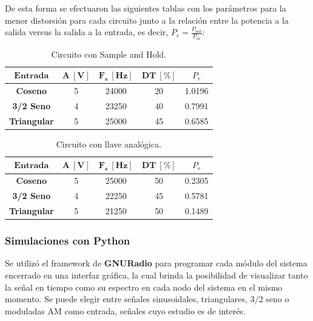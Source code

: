 De esta forma se efectuaron las siguientes tablas con los parámetros para la menor distorsión para cada circuito junto a la relación entre la potencia a la salida versus la salida a la entrada, es decir, $P_r = \frac{P_{out}}{P_{in}}$:
\begin{multicols}{2}
\begin{table}[H]
\centering
\begin{tabular}{ccccc}
\hline
$\mathbf{Entrada}$  & $\mathbf{A \ [V]}$ & $\mathbf{F_s \ [Hz]}$ & $\mathbf{DT \ [\%]}$ & $P_r$\\ \hline
\textbf{Coseno}     & 5                 & 24000                 & 20         &      1.0196     \\
\textbf{3/2 Seno}   & 4                & 23250                 & 40           &    0.7991     \\
\textbf{Triangular} & 5                  & 25000                 & 45          &       0.6585 	\\ \hline
\end{tabular}
\caption{Circuito con Sample and Hold.}
\label{tab:res1}
\end{table}
\begin{table}[H]
\centering
\begin{tabular}{ccccc}
\hline
$\mathbf{Entrada}$  & $\mathbf{A \ [V]}$ & $\mathbf{F_s \ [Hz]}$ & $\mathbf{DT \ [\%]}$ &$P_r$ \\ \hline
\textbf{Coseno}     & 5                  & 25000                 & 50       &     0.2305       \\
\textbf{3/2 Seno}   & 4                  & 22250                 & 45        &      0.5781     \\
\textbf{Triangular} & 5                  & 21250                 & 50         &    0.1489      \\ \hline
\end{tabular}
\caption{Circuito con llave analógica.}
\label{tab:res2}
\end{table}
\end{multicols}


\subsubsection{Simulaciones con Python}
Se utilizó el framework de \textbf{GNURadio} para programar cada módulo del sistema encerrado en una interfaz gráfica, la cual brinda la posibilidad de visualizar tanto la señal en tiempo como su espectro en cada nodo del sistema en el mismo momento. Se puede elegir entre señales sinusoidales, triangulares, 3/2 seno o moduladas AM como entrada, señales cuyo estudio es de interés.

